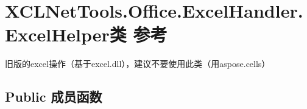 \hypertarget{class_x_c_l_net_tools_1_1_office_1_1_excel_handler_1_1_excel_helper}{\section{X\-C\-L\-Net\-Tools.\-Office.\-Excel\-Handler.\-Excel\-Helper类 参考}
\label{class_x_c_l_net_tools_1_1_office_1_1_excel_handler_1_1_excel_helper}
}


旧版的excel操作（基于excel.\-dll），建议不要使用此类（用aspose.\-cells）  


\subsection*{Public 成员函数}
